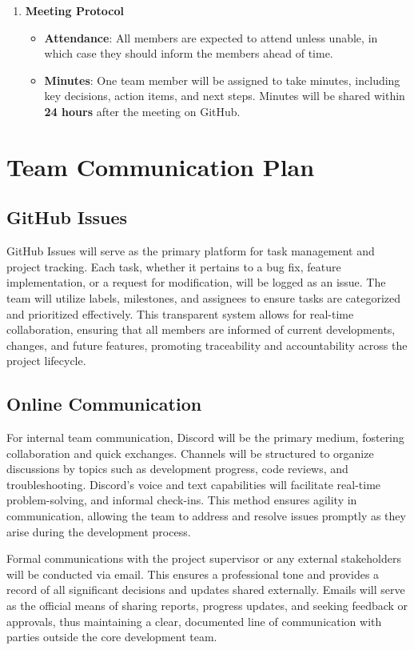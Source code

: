 \documentclass{article}
\begin{document}
\begin{enumerate}[label=\textbf{\arabic*}]
    \item \textbf{Meeting Protocol}
    \begin{itemize}
        \item \textbf{Attendance}: All members are expected to attend unless
        unable, in which case they should inform the members ahead of time.
        \item \textbf{Minutes}: One team member will be assigned to take
        minutes, including key decisions, action items, and next steps. Minutes
        will be shared within \textbf{24 hours} after the meeting on GitHub.
    \end{itemize}

\end{enumerate}


\section{Team Communication Plan}

\subsection*{GitHub Issues}
GitHub Issues will serve as the primary platform for task management and project
tracking. Each task, whether it pertains to a bug fix, feature implementation,
or a request for modification, will be logged as an issue. The team will utilize
labels, milestones, and assignees to ensure tasks are categorized and
prioritized effectively. This transparent system allows for real-time
collaboration, ensuring that all members are informed of current developments,
changes, and future features, promoting traceability and accountability across
the project lifecycle.

\subsection*{Online Communication}
For internal team communication, Discord will be the primary medium, fostering
collaboration and quick exchanges. Channels will be structured to organize
discussions by topics such as development progress, code reviews, and
troubleshooting. Discord's voice and text capabilities will facilitate real-time
problem-solving, and informal check-ins. This method ensures agility in
communication, allowing the team to address and resolve issues promptly as they
arise during the development process.

Formal communications with the project supervisor or any external stakeholders
will be conducted via email. This ensures a professional tone and provides a
record of all significant decisions and updates shared externally. Emails will
serve as the official means of sharing reports, progress updates, and seeking
feedback or approvals, thus maintaining a clear, documented line of
communication with parties outside the core development team.
\end{document}
